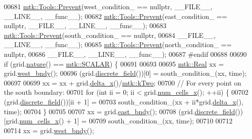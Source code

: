 \begin{DoxyCode}
00681   \hyperlink{classmtk_1_1Tools_a332324c6f25e66be9dff48c5987a3b9f}{mtk::Tools::Prevent}(west\_condition\_ == \textcolor{keyword}{nullptr}, \_\_FILE\_\_, \_\_LINE\_\_, \_\_func\_\_);
00682   \hyperlink{classmtk_1_1Tools_a332324c6f25e66be9dff48c5987a3b9f}{mtk::Tools::Prevent}(east\_condition\_ == \textcolor{keyword}{nullptr}, \_\_FILE\_\_, \_\_LINE\_\_, \_\_func\_\_);
00683   \hyperlink{classmtk_1_1Tools_a332324c6f25e66be9dff48c5987a3b9f}{mtk::Tools::Prevent}(south\_condition\_ == \textcolor{keyword}{nullptr},
00684                       \_\_FILE\_\_, \_\_LINE\_\_, \_\_func\_\_);
00685   \hyperlink{classmtk_1_1Tools_a332324c6f25e66be9dff48c5987a3b9f}{mtk::Tools::Prevent}(north\_condition\_ == \textcolor{keyword}{nullptr},
00686                       \_\_FILE\_\_, \_\_LINE\_\_, \_\_func\_\_);
00687 \textcolor{preprocessor}{  #endif}
00688 
00690   \textcolor{keywordflow}{if} (grid.\hyperlink{classmtk_1_1UniStgGrid2D_a99a3a9cdb05b7306be99bde935509e30}{nature}() == \hyperlink{namespacemtk_ga4c54f2a329cfb4e56213b02a259d19e2af481d45bd70d41381c7d72e200889205}{mtk::SCALAR}) \{
00691 
00693 
00695     \hyperlink{group__c01-roots_gac080bbbf5cbb5502c9f00405f894857d}{mtk::Real} xx = grid.\hyperlink{classmtk_1_1UniStgGrid2D_af2b1712387ded85edaf2b64617d3fc13}{west\_bndy}();
00696     (grid.\hyperlink{classmtk_1_1UniStgGrid2D_a3e72d59843a3f9c5e47da07e5850dfe0}{discrete\_field}())[0] = south\_condition\_(xx, time);
00697 
00699     xx = xx + grid.\hyperlink{classmtk_1_1UniStgGrid2D_aca4710004c4a7da6a9e8fd6ab32a691f}{delta\_x}()/\hyperlink{group__c01-roots_gaf39c2d851a2db744f4feb1c5ab3ec2cf}{mtk::kTwo};
00700     \textcolor{comment}{// For every point on the south boundary:}
00701     \textcolor{keywordflow}{for} (\textcolor{keywordtype}{int} ii = 0; ii < grid.\hyperlink{classmtk_1_1UniStgGrid2D_a2d182866a398aba8e4829590e85bf939}{num\_cells\_x}(); ++ii) \{
00702       (grid.\hyperlink{classmtk_1_1UniStgGrid2D_a3e72d59843a3f9c5e47da07e5850dfe0}{discrete\_field}())[ii + 1] =
00703         south\_condition\_(xx + ii*grid.\hyperlink{classmtk_1_1UniStgGrid2D_aca4710004c4a7da6a9e8fd6ab32a691f}{delta\_x}(), time);
00704     \}
00705 
00707     xx = grid.\hyperlink{classmtk_1_1UniStgGrid2D_a03f689eb29a6369b82ce1207c655d5ff}{east\_bndy}();
00708     (grid.\hyperlink{classmtk_1_1UniStgGrid2D_a3e72d59843a3f9c5e47da07e5850dfe0}{discrete\_field}())[grid.\hyperlink{classmtk_1_1UniStgGrid2D_a2d182866a398aba8e4829590e85bf939}{num\_cells\_x}() + 1] =
00709       south\_condition\_(xx, time);
00710 
00712 
00714     xx = grid.\hyperlink{classmtk_1_1UniStgGrid2D_af2b1712387ded85edaf2b64617d3fc13}{west\_bndy}();

\end{DoxyCode}
